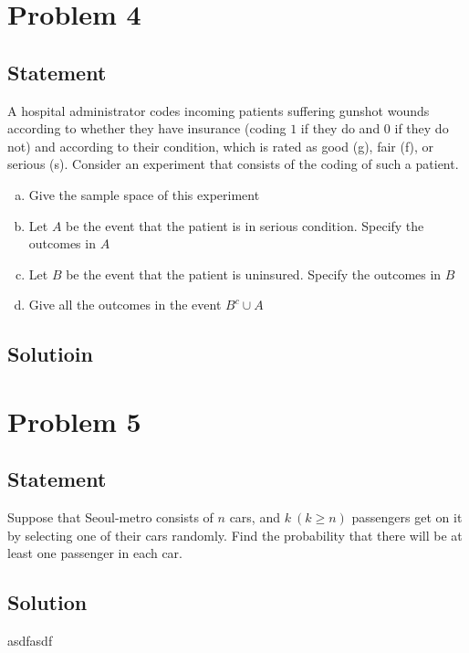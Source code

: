 \documentclass[12pt]{article}
\theoremstyle{plain}
\begin{document}
\section*{Problem 4}
\subsection*{Statement}
A hospital administrator codes incoming patients suffering gunshot wounds according to whether they have insurance (coding $1$ if they do and $0$ if they do not) and according to their condition, which is rated as good (g), fair (f), or serious (s). Consider an experiment that consists of the coding of such a patient.
\begin{enumerate}[(a)]
	\item Give the sample space of this experiment
	\item Let $A$ be the event that the patient is in serious condition. Specify the outcomes in $A$
	\item Let $B$ be the event that the patient is uninsured. Specify the outcomes in $B$
	\item Give all the outcomes in the event $B^c\cup A$
\end{enumerate}
\subsection*{Solutioin}

\newpage
\section*{Problem 5}
\subsection*{Statement}
Suppose that Seoul-metro consists of $n$ cars, and $k\ (k\geq n)$ passengers get on it by selecting one of their cars randomly. Find the probability that there will be at least one passenger in each car.
\subsection*{Solution}
asdfasdf
\end{document}
